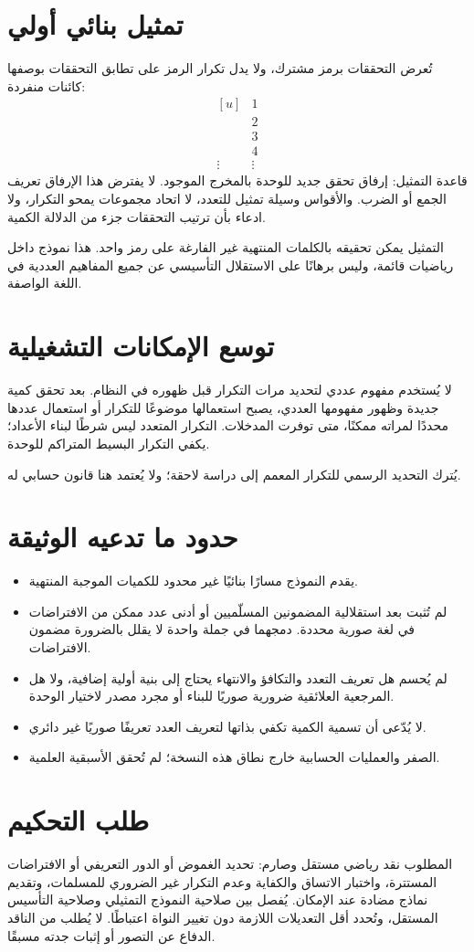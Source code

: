 \documentclass[12pt,a4paper]{article}
\begin{document}
\section{تمثيل بنائي أولي}
تُعرض التحققات برمز مشترك، ولا يدل تكرار الرمز على تطابق التحققات بوصفها كائنات منفردة:
\[
\begin{array}{c|c}
[u]&1\\
[u,u]&2\\
[u,u,u]&3\\
[u,u,u,u]&4\\
\vdots&\vdots
\end{array}
\]
قاعدة التمثيل: إرفاق تحقق جديد للوحدة بالمخرج الموجود. لا يفترض هذا الإرفاق تعريف الجمع أو الضرب. والأقواس وسيلة تمثيل للتعدد، لا اتحاد مجموعات يمحو التكرار، ولا ادعاء بأن ترتيب التحققات جزء من الدلالة الكمية.

التمثيل يمكن تحقيقه بالكلمات المنتهية غير الفارغة على رمز واحد. هذا نموذج داخل رياضيات قائمة، وليس برهانًا على الاستقلال التأسيسي عن جميع المفاهيم العددية في اللغة الواصفة.
\section{توسع الإمكانات التشغيلية}
لا يُستخدم مفهوم عددي لتحديد مرات التكرار قبل ظهوره في النظام. بعد تحقق كمية جديدة وظهور مفهومها العددي، يصبح استعمالها موضوعًا للتكرار أو استعمال عددها محددًا لمراته ممكنًا، متى توفرت المدخلات. التكرار المتعدد ليس شرطًا لبناء الأعداد؛ يكفي التكرار البسيط المتراكم للوحدة.

يُترك التحديد الرسمي للتكرار المعمم إلى دراسة لاحقة؛ ولا يُعتمد هنا قانون حسابي له.
\section{حدود ما تدعيه الوثيقة}
\begin{itemize}
\item يقدم النموذج مسارًا بنائيًا غير محدود للكميات الموجبة المنتهية.
\item لم تُثبت بعد استقلالية المضمونين المسلّميين أو أدنى عدد ممكن من الافتراضات في لغة صورية محددة. دمجهما في جملة واحدة لا يقلل بالضرورة مضمون الافتراضات.
\item لم يُحسم هل تعريف التعدد والتكافؤ والانتهاء يحتاج إلى بنية أولية إضافية، ولا هل المرجعية العلائقية ضرورية صوريًا للبناء أو مجرد مصدر لاختيار الوحدة.
\item لا يُدّعى أن تسمية الكمية تكفي بذاتها لتعريف العدد تعريفًا صوريًا غير دائري.
\item الصفر والعمليات الحسابية خارج نطاق هذه النسخة؛ لم تُحقق الأسبقية العلمية.
\end{itemize}
\section{طلب التحكيم}
المطلوب نقد رياضي مستقل وصارم: تحديد الغموض أو الدور التعريفي أو الافتراضات المستترة، واختبار الاتساق والكفاية وعدم التكرار غير الضروري للمسلمات، وتقديم نماذج مضادة عند الإمكان. يُفصل بين صلاحية النموذج التمثيلي وصلاحية التأسيس المستقل، وتُحدد أقل التعديلات اللازمة دون تغيير النواة اعتباطًا. لا يُطلب من الناقد الدفاع عن التصور أو إثبات جدته مسبقًا.
\end{document}
